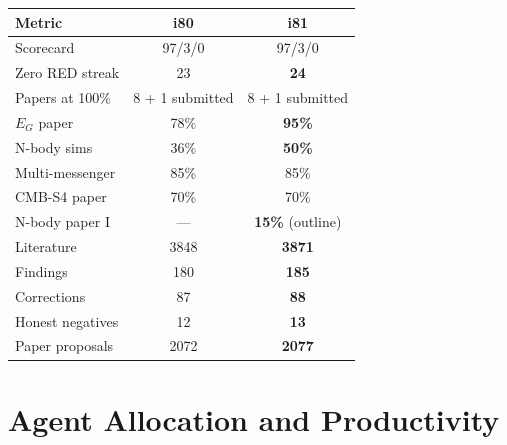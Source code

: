 \documentclass[11pt,a4paper]{article}
\begin{document}
\begin{center}
\begin{tabular}{lcc}
\toprule
\textbf{Metric} & \textbf{i80} & \textbf{i81} \\
\midrule
Scorecard & 97/3/0 & 97/3/0 \\
Zero RED streak & 23 & \textbf{24} \\
Papers at 100\% & 8 + 1 submitted & 8 + 1 submitted \\
$E_G$ paper & 78\% & \textbf{95\%} \\
N-body sims & 36\% & \textbf{50\%} \\
Multi-messenger & 85\% & 85\% \\
CMB-S4 paper & 70\% & 70\% \\
N-body paper I & --- & \textbf{15\%} (outline) \\
Literature & 3848 & \textbf{3871} \\
Findings & 180 & \textbf{185} \\
Corrections & 87 & \textbf{88} \\
Honest negatives & 12 & \textbf{13} \\
Paper proposals & 2072 & \textbf{2077} \\
\bottomrule
\end{tabular}
\end{center}

\section{Agent Allocation and Productivity}
\end{document}
